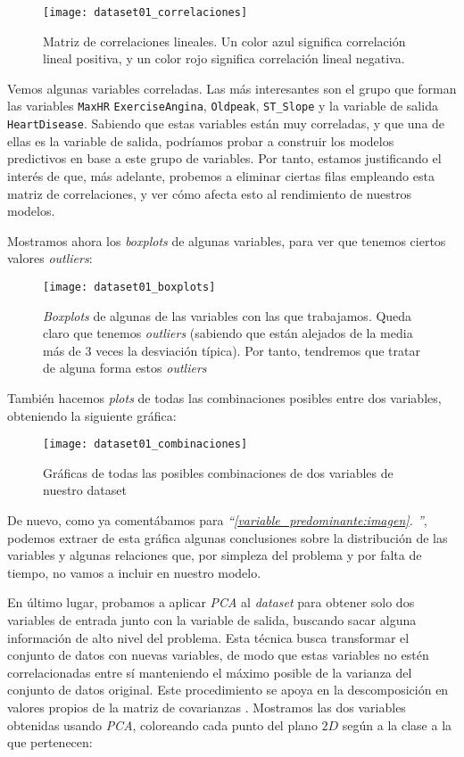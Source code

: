 \documentclass[11pt]{article}
\newcommand{\customcite}[1]{\emph{``\ref{#1}. \nameref{#1}''}}
\begin{document}
\begin{figure}[H]
    \centering
    \texttt{[image: dataset01\_correlaciones]}
    \caption{Matriz de correlaciones lineales. Un color azul significa correlación lineal positiva, y un color rojo significa correlación lineal negativa.}
    \label{dataset01_correlaciones:imagen}
\end{figure}

Vemos algunas variables correladas. Las más interesantes son el grupo que forman las variables \lstinline{MaxHR} \lstinline{ExerciseAngina}, \lstinline{Oldpeak}, \lstinline{ST_Slope} y la variable de salida \lstinline{HeartDisease}. Sabiendo que estas variables están muy correladas, y que una de ellas es la variable de salida, podríamos probar a construir los modelos predictivos en base a este grupo de variables. Por tanto, estamos justificando el interés de que, más adelante, probemos a eliminar ciertas filas empleando esta matriz de correlaciones, y ver cómo afecta esto al rendimiento de nuestros modelos.

Mostramos ahora los \emph{boxplots} de algunas variables, para ver que tenemos ciertos valores \emph{outliers}:

\begin{figure}[H]
    \centering
    \texttt{[image: dataset01\_boxplots]}
    \caption{\emph{Boxplots} de algunas de las variables con las que trabajamos. Queda claro que tenemos \emph{outliers} (sabiendo que están alejados de la media más de 3 veces la desviación típica). Por tanto, tendremos que tratar de alguna forma estos \emph{outliers}}
\end{figure}

También hacemos \emph{plots} de todas las combinaciones posibles entre dos variables, obteniendo la siguiente gráfica:

\begin{figure}[H]
    \centering
    \texttt{[image: dataset01\_combinaciones]}
    \caption{Gráficas de todas las posibles combinaciones de dos variables de nuestro dataset}
\end{figure}

De nuevo, como ya comentábamos para \customcite{variable_predominante:imagen}, podemos extraer de esta gráfica algunas conclusiones sobre la distribución de las variables y algunas relaciones que, por simpleza del problema y por falta de tiempo, no vamos a incluir en nuestro modelo.

En último lugar, probamos a aplicar \emph{PCA} al \emph{dataset} para obtener solo dos variables de entrada junto con la variable de salida, buscando sacar alguna información de alto nivel del problema. Esta técnica busca transformar el conjunto de datos con nuevas variables, de modo que estas variables no estén correlacionadas entre sí manteniendo el máximo posible de la varianza del conjunto de datos original. Este procedimiento se apoya en la descomposición en valores propios de la matriz de covarianzas \cite{pca:online}. Mostramos las dos variables obtenidas usando \emph{PCA}, coloreando cada punto del plano $2D$ según a la clase a la que pertenecen:
\end{document}
